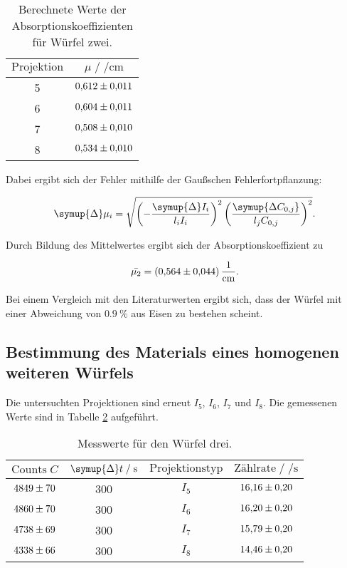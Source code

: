\begin{table}[H]
  \centering
  \caption{Berechnete Werte der Absorptionskoeffizienten für Würfel zwei.}
  \label{tab:mess3}
  \begin{tabular}{c c}
  \toprule
  $\text{Projektion}$ & $\mu \;/\; \si{\per\centi\metre}$\\
  \midrule
      5 & $\num{0.612+-0.011}$\\
      6 & $\num{0.604+-0.011}$\\
      7 & $\num{0.508+-0.010}$\\
      8 & $\num{0.534+-0.010}$\\
  \bottomrule
  \end{tabular}
\end{table}

Dabei ergibt sich der Fehler mithilfe der Gaußschen Fehlerfortpflanzung:

\begin{equation*}
  \symup{\Delta} \mu_i = \sqrt{\left(-\frac{\symup{\Delta}I_i}{l_i I_i}\right)^2\left(\frac{\symup{\Delta C_{0,j}}}{l_j C_{0,j}}\right)^2}.
\end{equation*}

Durch Bildung des Mittelwertes ergibt sich der Absorptionskoeffizient zu 

\begin{equation*}
  \bar{\mu_2} = \SI{0.564+-0.044}{\per\centi\metre}. 
\end{equation*}

Bei einem Vergleich mit den Literaturwerten ergibt sich, dass der Würfel mit einer Abweichung von $\SI{0.9}{\percent}$ aus Eisen zu bestehen scheint. 

\subsection{Bestimmung des Materials eines homogenen weiteren Würfels}

Die untersuchten Projektionen sind erneut $I_5$, $I_6$, $I_7$ und $I_8$. Die gemessenen Werte sind in 
Tabelle \ref{tab:mess4} aufgeführt. 

\begin{table}[H]
  \centering
  \caption{Messwerte für den Würfel drei.}
  \label{tab:mess4}
  \begin{tabular}{c c c c}
  \toprule
  $\text{Counts} \; C$ & $\symup{\Delta} t \;/\; \si{\second}$ & $\text{Projektionstyp}$ & $\text{Zählrate} \;/\; \si{\per\second}$\\
  \midrule
      $\num{4849+-70}$ & 300 & $I_{5}$ & $\num{16.16+-0.2}$\\
      $\num{4860+-70}$ & 300 & $I_{6}$ & $\num{16.20+-0.2}$\\
      $\num{4738+-69}$ & 300 & $I_{7}$ & $\num{15.79+-0.2}$\\
      $\num{4338+-66}$ & 300 & $I_{8}$  & $\num{14.46+-0.2}$\\
  \bottomrule
  \end{tabular}
\end{table}

